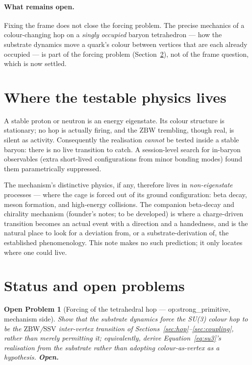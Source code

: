 \documentclass[11pt,a4paper]{article}
\newtheorem{openprob}[theorem]{Open Problem}
\newcommand{\SSV}{\mathrm{SSV}}
\newcommand{\ZBW}{\mathrm{ZBW}}
\begin{document}
\paragraph{What remains open.} Fixing the frame does not close the forcing
problem. The precise mechanics of a colour-changing hop on a \emph{singly
occupied} baryon tetrahedron --- how the substrate dynamics move a quark's
colour between vertices that are each already occupied --- is part of the forcing
problem (Section~\ref{sec:status}), not of the frame question, which is now
settled.

\section{Where the testable physics lives}
\label{sec:testable}

A stable proton or neutron is an energy eigenstate. Its colour structure is
stationary; no hop is actually firing, and the $\ZBW$ trembling, though real, is
silent as activity. Consequently the realisation \emph{cannot} be tested inside
a stable baryon: there is no live transition to catch. A session-level search
for in-baryon observables (extra short-lived configurations from minor bonding
modes) found them parametrically suppressed.

The mechanism's distinctive physics, if any, therefore lives in
\emph{non-eigenstate} processes --- where the cage is forced out of its ground
configuration: beta decay, meson formation, and high-energy collisions. The
companion beta-decay and chirality mechanism (founder's notes; to be developed)
is where a charge-driven transition becomes an actual event with a direction and
a handedness, and is the natural place to look for a deviation from, or a
substrate-derivation of, the established phenomenology. This note makes no such
prediction; it only locates where one could live.

\section{Status and open problems}
\label{sec:status}

\begin{openprob}[Forcing of the tetrahedral hop --- op:strong\_primitive, mechanism side]
Show that the substrate dynamics \emph{force} the SU(3) colour hop to be the
$\ZBW$/$\SSV$ inter-vertex transition of Sections~\ref{sec:hop}--\ref{sec:coupling},
rather than merely permitting it; equivalently, derive
Equation~\eqref{eq:su3}'s realisation from the substrate rather than adopting
colour-as-vertex as a hypothesis. \textbf{Open.}
\end{openprob}
\end{document}

